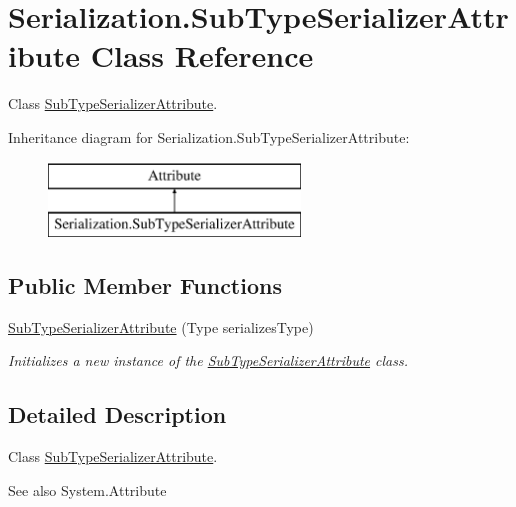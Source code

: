 \hypertarget{class_serialization_1_1_sub_type_serializer_attribute}{}\section{Serialization.\+Sub\+Type\+Serializer\+Attribute Class Reference}
\label{class_serialization_1_1_sub_type_serializer_attribute}


Class \hyperlink{class_serialization_1_1_sub_type_serializer_attribute}{Sub\+Type\+Serializer\+Attribute}.  


Inheritance diagram for Serialization.\+Sub\+Type\+Serializer\+Attribute\+:\begin{figure}[H]
\begin{center}
\leavevmode
\includegraphics[height=2.000000cm]{class_serialization_1_1_sub_type_serializer_attribute}
\end{center}
\end{figure}
\subsection*{Public Member Functions}
\begin{DoxyCompactItemize}
\item 
\hyperlink{class_serialization_1_1_sub_type_serializer_attribute_aa77d94a73aa56a1e382ec6801fb883e5}{Sub\+Type\+Serializer\+Attribute} (Type serializes\+Type)
\begin{DoxyCompactList}\small\item\em Initializes a new instance of the \hyperlink{class_serialization_1_1_sub_type_serializer_attribute}{Sub\+Type\+Serializer\+Attribute} class. \end{DoxyCompactList}\end{DoxyCompactItemize}


\subsection{Detailed Description}
Class \hyperlink{class_serialization_1_1_sub_type_serializer_attribute}{Sub\+Type\+Serializer\+Attribute}. 

\begin{DoxySeeAlso}{See also}
System.\+Attribute


\end{DoxySeeAlso}


